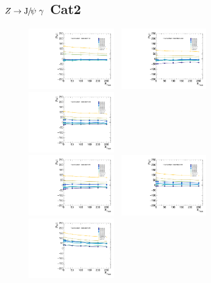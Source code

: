 \subsection{$Z\to \JPsi\ \gamma$ Cat2}
\begin{figure}[!ht]
  \centering
  \includegraphics[width=0.33\textwidth]{Fig/BiasStudy/Linearity/ZJpsiG_Cat2/pull_mean_linearity_TrueFunc0}~
  \includegraphics[width=0.33\textwidth]{Fig/BiasStudy/Linearity/ZJpsiG_Cat2/pull_mean_linearity_TrueFunc1}~
  \includegraphics[width=0.33\textwidth]{Fig/BiasStudy/Linearity/ZJpsiG_Cat2/pull_mean_linearity_TrueFunc2}\\
  \includegraphics[width=0.33\textwidth]{Fig/BiasStudy/Linearity/ZJpsiG_Cat2/pull_mean_linearity_TrueFunc3}~
  \includegraphics[width=0.33\textwidth]{Fig/BiasStudy/Linearity/ZJpsiG_Cat2/pull_mean_linearity_TrueFunc4}~
  \includegraphics[width=0.33\textwidth]{Fig/BiasStudy/Linearity/ZJpsiG_Cat2/pull_mean_linearity_TrueFunc5}\\

\end{figure}
